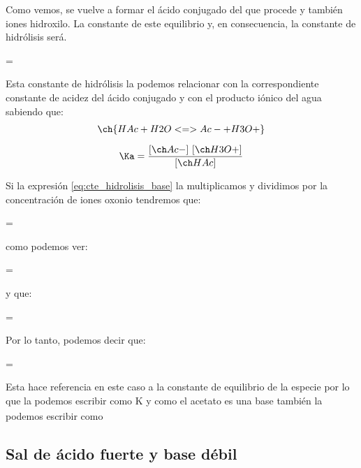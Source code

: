 Como vemos, se vuelve a formar el ácido conjugado del que procede y también iones hidroxilo.
La constante de este equilibrio y, en consecuencia, la constante de hidrólisis \Kh{} será.
\begin{centeredequation}
    \Kh =  \label{eq:cte_hidrolisis_base}
\end{centeredequation}



Esta constante de hidrólisis \Kh la podemos relacionar con la correspondiente constante de acidez del ácido conjugado  y con el producto iónico del agua sabiendo que:
\begin{gather*}
    \ch{HAc + H2O <=> Ac- + H3O+}\separ
    \Ka = \dfrac{\conc{Ac-}\ \conc{H3O+}}{\conc{HAc}}
\end{gather*}

Si la expresión \eqref{eq:cte_hidrolisis_base} la multiplicamos y dividimos por la concentración de iones oxonio  tendremos que:
\begin{centeredequation}
    \Kh = 
\end{centeredequation}

como podemos ver:
\begin{centeredequation}
    \color{blue}  = 
\end{centeredequation}

y que:
\begin{centeredequation}
    \color{red} \Kh = \ 
\end{centeredequation}

Por lo tanto, podemos decir que:
\begin{centeredequation}
    \Kh = \dfrac{{\color{red}\Kw}}{{\color{blue}\Ka}}
\end{centeredequation}


Esta \Kh hace referencia en este caso a la constante de equilibrio de la especie  por lo que la podemos escribir como K\textsubscript{} y como el acetato es una base también la podemos escribir como \Kb

\subsection{Sal de ácido fuerte y base débil}\label{subsec:sal-de-acido-fuerte-y-base-debil}

